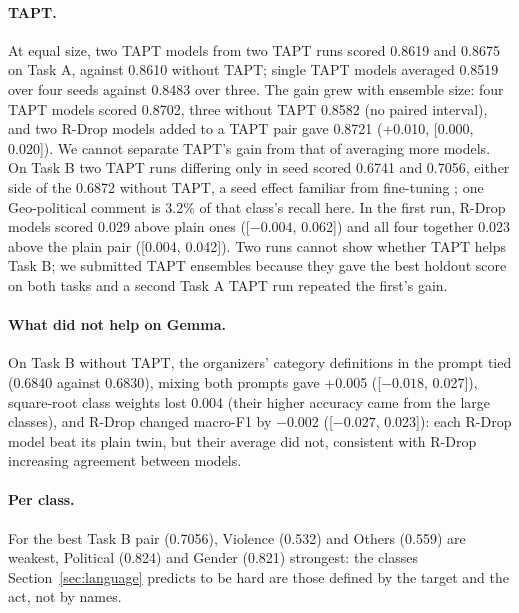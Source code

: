 \documentclass[11pt]{article}
\newcommand{\taska}{Task A}
\newcommand{\taskb}{Task B}
\begin{document}
\paragraph{TAPT.} At equal size, two TAPT models from two TAPT runs scored 0.8619
and 0.8675 on \taska{}, against 0.8610 without TAPT; single TAPT models averaged
0.8519 over four seeds against 0.8483 over three. The gain grew with ensemble
size: four TAPT models scored 0.8702, three without TAPT 0.8582 (no paired
interval), and two R-Drop models added to a TAPT pair gave 0.8721 (+0.010, [0.000,
0.020]). We cannot separate TAPT's gain from that of averaging more models. On
\taskb{} two TAPT runs differing only in seed scored 0.6741 and 0.7056, either
side of the 0.6872 without TAPT, a seed effect familiar from fine-tuning
\citep{dodge-etal-2020-fine}; one Geo-political comment is 3.2\% of that
class's recall here. In the first run, R-Drop models scored 0.029 above plain ones
([$-0.004$, 0.062]) and all four together 0.023 above the plain pair ([0.004,
0.042]). Two runs cannot show whether TAPT helps \taskb{}; we submitted TAPT
ensembles because they gave the best holdout score on both tasks and a second
\taska{} TAPT run repeated the first's gain.

\paragraph{What did not help on Gemma.} On \taskb{} without TAPT, the organizers'
category definitions in the prompt tied (0.6840 against 0.6830), mixing both
prompts gave +0.005 ([$-0.018$, 0.027]), square-root class weights lost 0.004
(their higher accuracy came from the large classes), and R-Drop changed
macro-F1 by $-0.002$ ([$-0.027$, 0.023]): each R-Drop model beat its plain twin,
but their average did not, consistent with R-Drop increasing agreement between
models.

\paragraph{Per class.} For the best \taskb{} pair (0.7056), Violence (0.532) and
Others (0.559) are weakest, Political (0.824) and Gender (0.821) strongest: the
classes Section~\ref{sec:language} predicts to be hard are those defined by the
target and the act, not by names.
\end{document}

